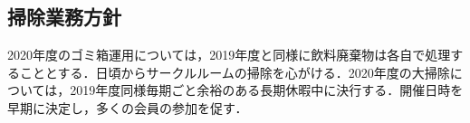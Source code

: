 \subsection*{掃除業務方針}
2020年度のゴミ箱運用については，2019年度と同様に飲料廃棄物は各自で処理することとする．日頃からサークルルームの掃除を心がける．2020年度の大掃除については，2019年度同様毎期ごと余裕のある長期休暇中に決行する．開催日時を早期に決定し，多くの会員の参加を促す．

